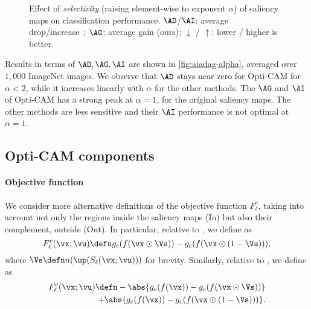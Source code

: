 \begin{figure}[htp!]
\begin{tabular}{ccc}
\end{tabular}
\caption{Effect of \emph{selectivity} (raising element-wise to exponent $\alpha$) of saliency maps on classification performance. $\AD$/$\AI$: average drop/increase~\citep{chattopadhay2018grad}; $\AG$: average gain (ours); $\downarrow$ / $\uparrow$: lower / higher is better.}
\label{fig:aiadag-alpha}
\end{figure}

Results in terms of $\AD, \AG, \AI$ are shown in \autoref{fig:aiadag-alpha}, averaged over $1,000$ ImageNet images. We observe that $\AD$ stays near zero for Opti-CAM for $\alpha < 2$, while it increases linearly with $\alpha$ for the other methods. The $\AG$ and $\AI$ of Opti-CAM has a strong peak at $\alpha = 1$, \ie for the original saliency maps. The other methods are less sensitive and their $\AI$ performance is not optimal at $\alpha = 1$.


\subsection{Opti-CAM components}

\paragraph{Objective function}

We consider more alternative definitions of the objective function $F^c_\ell$, taking into account not only the regions inside the saliency maps (In) but also their complement, outside (Out). In particular, relative to \Fdef, we define \MIODref as
\begin{equation}
	F^c_\ell(\vx; \vu) \defn g_c(f(\vx \odot \Vs)) - g_c(f(\vx \odot (1-\Vs))),
\label{eq:mi-dref}
\end{equation}
where $\Vs \defn n(\up(S_\ell(\vx; \vu)))$ for brevity. Similarly, relative to \Fref, we define \MIOFref as
\begin{equation}
\begin{split}
	F^c_\ell(\vx; \vu) \defn
		- \abs{g_c(f(\vx)) - g_c(f(\vx \odot \Vs))} \\
		+ \abs{g_c(f(\vx)) - g_c(f(\vx \odot (1-\Vs)))}.
\end{split}
\label{eq:mi-ref}
\end{equation}

